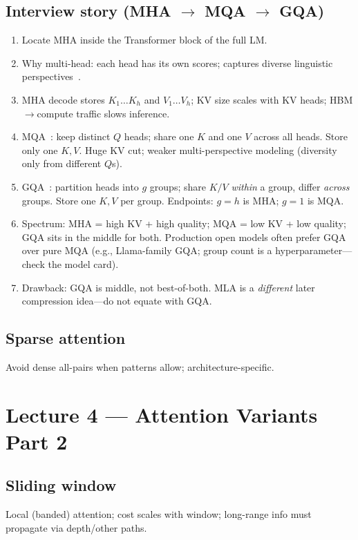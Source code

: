 \documentclass[11pt,a4paper]{article}
\begin{document}
\subsection{Interview story (MHA $\rightarrow$ MQA $\rightarrow$ GQA)}
\begin{enumerate}[leftmargin=*]
  \item Locate MHA inside the Transformer block of the full LM.
  \item Why multi-head: each head has its own scores; captures diverse linguistic perspectives~\cite{vaswani2017attention}.
  \item MHA decode stores $K_1{\ldots}K_h$ and $V_1{\ldots}V_h$; KV size scales with KV heads; HBM$\to$compute traffic slows inference.
  \item MQA~\cite{shazeer2019mqa}: keep distinct $Q$ heads; share one $K$ and one $V$ across all heads.
        Store only one $K,V$. Huge KV cut; weaker multi-perspective modeling (diversity only from different $Q$s).
  \item GQA~\cite{ainslie2023gqa}: partition heads into $g$ groups; share $K/V$ \emph{within} a group, differ \emph{across} groups.
        Store one $K,V$ per group. Endpoints: $g{=}h$ is MHA; $g{=}1$ is MQA.
  \item Spectrum: MHA = high KV + high quality; MQA = low KV + low quality; GQA sits in the middle for both.
        Production open models often prefer GQA over pure MQA (e.g., Llama-family GQA; group count is a hyperparameter---check the model card).
  \item Drawback: GQA is middle, not best-of-both. MLA is a \emph{different} later compression idea---do not equate with GQA.
\end{enumerate}

\subsection{Sparse attention}
Avoid dense all-pairs when patterns allow; architecture-specific.

\section{Lecture 4 --- Attention Variants Part 2}
\subsection{Sliding window}
Local (banded) attention; cost scales with window; long-range info must propagate via depth/other paths.
\end{document}
